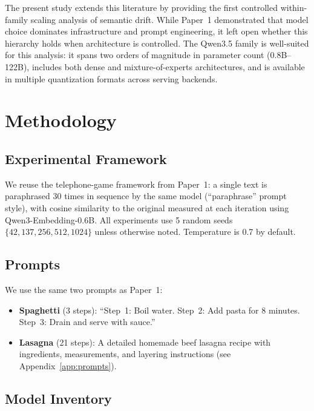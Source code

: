 \documentclass[11pt]{article}
\begin{document}
The present study extends this literature by providing the first
controlled within-family scaling analysis of semantic drift. While Paper~1
demonstrated that model choice dominates infrastructure and prompt
engineering, it left open whether this hierarchy holds when architecture is
controlled. The Qwen3.5 family is well-suited for this analysis: it spans
two orders of magnitude in parameter count (0.8B--122B), includes both
dense and mixture-of-experts architectures, and is available in multiple
quantization formats across serving backends.

\section{Methodology}
\label{sec:method}

\subsection{Experimental Framework}

We reuse the telephone-game framework from Paper~1: a single text is
paraphrased 30 times in sequence by the same model (``paraphrase'' prompt
style), with cosine similarity to the original measured at each iteration
using Qwen3-Embedding-0.6B. All experiments use 5 random seeds
$\{42, 137, 256, 512, 1024\}$ unless otherwise noted. Temperature is 0.7
by default.

\subsection{Prompts}

We use the same two prompts as Paper~1:
\begin{itemize}[leftmargin=*]
  \item \textbf{Spaghetti} (3 steps): ``Step~1: Boil water. Step~2: Add
        pasta for 8 minutes. Step~3: Drain and serve with sauce.''
  \item \textbf{Lasagna} (21 steps): A detailed homemade beef lasagna
        recipe with ingredients, measurements, and layering instructions
        (see Appendix~\ref{app:prompts}).
\end{itemize}

\subsection{Model Inventory}
\end{document}
